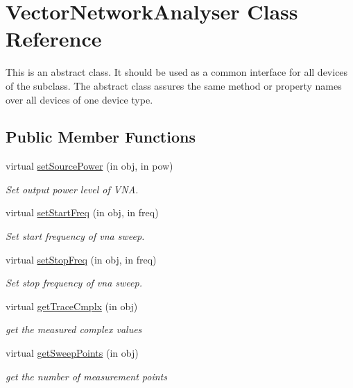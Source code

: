 \hypertarget{class_vector_network_analyser}{}\section{Vector\+Network\+Analyser Class Reference}
\label{class_vector_network_analyser}


This is an abstract class. It should be used as a common interface for all devices of the subclass. The abstract class assures the same method or property names over all devices of one device type.  


\subsection*{Public Member Functions}
\begin{DoxyCompactItemize}
\item 
virtual \hyperlink{class_vector_network_analyser_a046f125f382e6d61c47f5310de0beae6}{set\+Source\+Power} (in obj, in pow)
\begin{DoxyCompactList}\small\item\em Set output power level of V\+NA. \end{DoxyCompactList}\item 
virtual \hyperlink{class_vector_network_analyser_a80f2fbd6ef0425348fa651c286065350}{set\+Start\+Freq} (in obj, in freq)
\begin{DoxyCompactList}\small\item\em Set start frequency of vna sweep. \end{DoxyCompactList}\item 
virtual \hyperlink{class_vector_network_analyser_a909388ee53bd7ed70e06451a792cf51b}{set\+Stop\+Freq} (in obj, in freq)
\begin{DoxyCompactList}\small\item\em Set stop frequency of vna sweep. \end{DoxyCompactList}\item 
virtual \hyperlink{class_vector_network_analyser_a4d18127562f541c12e217e1edffd0df9}{get\+Trace\+Cmplx} (in obj)
\begin{DoxyCompactList}\small\item\em get the measured complex values \end{DoxyCompactList}\item 
virtual \hyperlink{class_vector_network_analyser_a6fea4338a2e20d0863c84bf411228c96}{get\+Sweep\+Points} (in obj)
\begin{DoxyCompactList}\small\item\em get the number of measurement points \end{DoxyCompactList}\item 

\end{DoxyCompactItemize}
